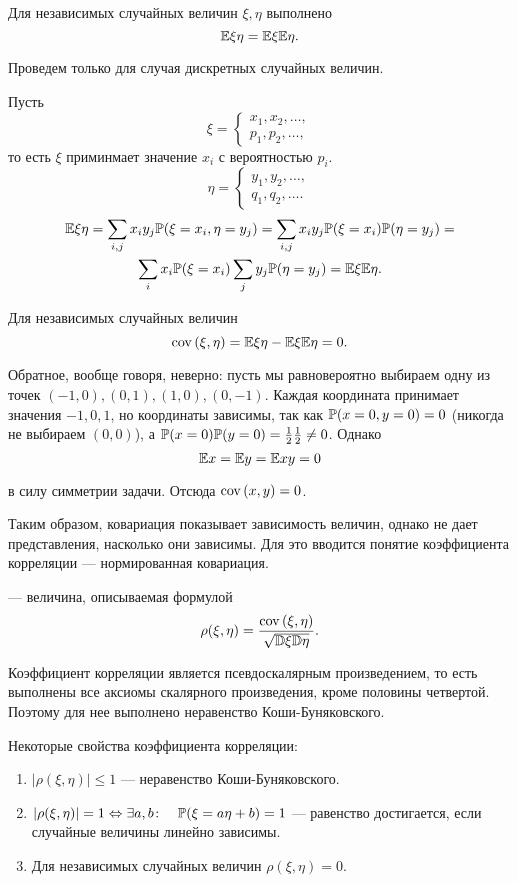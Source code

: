 \documentclass[../TV&MS.tex]{subfiles}
\begin{document}
\begin{St}
	Для независимых случайных величин $\xi, \eta$ выполнено
	$$\mathbb{E}\xi\eta = \mathbb{E}\xi\mathbb{E}\eta.$$
\end{St}
\begin{Proof}
	Проведем только для случая дискретных случайных величин.
	
	Пусть 
\[
   	\xi = 
  	\begin{cases}
  		x_1, x_2, \ldots, \\
  		p_1, p_2, \ldots,
  	\end{cases}
\]
	то есть $\xi$ приминмает значение $x_i$ с вероятностью $p_i$.
\[
   	\eta = 
  	\begin{cases}
  		y_1, y_2, \ldots,\\
  		q_1, q_2, \ldots.
  	\end{cases}
\]
\begin{multline*}
	\mathbb{E}\xi\eta=\sum\limits_{i,j} x_iy_j\mathbb{P}(\xi=x_i, \eta=y_j) = 
	\sum\limits_{i,j} x_iy_j\mathbb{P}(\xi=x_i)\mathbb{P}(\eta=y_j) = \\  
	\sum\limits_{i} x_i\mathbb{P}(\xi=x_i)\sum\limits_j y_j\mathbb{P}(\eta=y_j) = 
	\mathbb{E}\xi\mathbb{E}\eta.
\end{multline*}
\end{Proof}

Для независимых случайных величин
$${\rm cov \,}(\xi,\eta) = \mathbb{E}\xi\eta - \mathbb{E}\xi\mathbb{E}\eta = 0.$$

Обратное, вообще говоря, неверно: пусть мы равновероятно выбираем 
одну из точек $(-1, 0), (0, 1), (1, 0), (0, -1)$. Каждая координата 
принимает значения $-1, 0, 1$, но координаты зависимы, так как 
$\mathbb{P}(x=0,  y=0) = 0$ (никогда не выбираем $(0,0)$), а 
$\mathbb{P}(x=0)\mathbb{P}(y=0) = \frac12\frac12 \not=0$. Однако
$$\mathbb{E} x = \mathbb{E} y = \mathbb{E} xy = 0$$ 

\noindent
в силу симметрии задачи. Отсюда ${\rm cov \,}(x,y) = 0$.

Таким образом, ковариация показывает зависимость величин, 
однако не дает представления, насколько они зависимы. Для это вводится 
понятие коэффициента корреляции --- нормированная ковариация.

\begin{Def}
 --- величина, описываемая формулой
$$\rho(\xi, \eta) = \frac{{\rm cov \,}(\xi, \eta)}{\sqrt{\mathbb{D}\xi\mathbb{D}\eta}}.$$
\end{Def}

Коэффициент корреляции является псевдоскалярным произведением, то есть 
выполнены все аксиомы скалярного произведения, кроме половины четвертой. 
Поэтому для нее выполнено неравенство Коши-Буняковского.

Некоторые свойства коэффициента корреляции:
\begin{enumerate}
	\item $|\rho(\xi, \eta)| \le 1$ --- неравенство Коши-Буняковского.
	\item $|\rho(\xi, \eta)| = 1 \Leftrightarrow \exists a, b \colon 
	\quad \mathbb{P}(\xi = a\eta + b) = 1$ --- равенство достигается, 
	если случайные величины линейно зависимы.
	
	\item Для независимых случайных величин $\rho(\xi, \eta) = 0$.
\end{enumerate} 

\newpage
\end{document}
